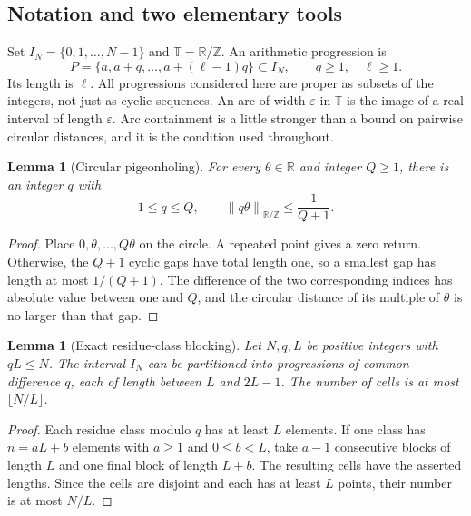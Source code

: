 \documentclass[11pt,letterpaper]{article}
\numberwithin{equation}{section}
\newtheorem{lemma}[theorem]{Lemma}
\theoremstyle{definition}
\theoremstyle{remark}
\newcommand{\R}{\mathbb R}
\newcommand{\Z}{\mathbb Z}
\newcommand{\T}{\mathbb T}
\newcommand{\1}{\mathbf 1}
\newcommand{\cnorm}[1]{\left\|#1\right\|_{\R/\Z}}
\newcommand{\eps}{\varepsilon}
\begin{document}
\subsection{Notation and two elementary tools}
Set $I_N=\{0,1,\ldots,N-1\}$ and $\T=\R/\Z$. An arithmetic progression is
\[
 P=\{a,a+q,\ldots,a+(\ell-1)q\}\subset I_N,
 \qquad q\geq1,\quad \ell\geq1.
\]
Its length is $\ell$. All progressions considered here are proper as subsets of the integers, not just as cyclic sequences. An arc of width $\eps$ in $\T$ is the image of a real interval of length $\eps$. Arc containment is a little stronger than a bound on pairwise circular distances, and it is the condition used throughout.

\begin{lemma}[Circular pigeonholing]
\label{gsr:dt:05:lem:circle}
For every $\theta\in\R$ and integer $Q\geq1$, there is an integer $q$ with
\[
 1\leq q\leq Q,\qquad \cnorm{q\theta}\leq\frac1{Q+1}.
\]
\end{lemma}
\begin{proof}
Place $0,\theta,\ldots,Q\theta$ on the circle. A repeated point gives a zero return. Otherwise, the $Q+1$ cyclic gaps have total length one, so a smallest gap has length at most $1/(Q+1)$. The difference of the two corresponding indices has absolute value between one and $Q$, and the circular distance of its multiple of $\theta$ is no larger than that gap.
\end{proof}

\begin{lemma}[Exact residue-class blocking]
\label{gsr:dt:05:lem:chunks}
Let $N,q,L$ be positive integers with $qL\leq N$. The interval $I_N$ can be partitioned into progressions of common difference $q$, each of length between $L$ and $2L-1$. The number of cells is at most $\lfloor N/L\rfloor$.
\end{lemma}
\begin{proof}
Each residue class modulo $q$ has at least $L$ elements. If one class has $n=aL+b$ elements with $a\geq1$ and $0\leq b<L$, take $a-1$ consecutive blocks of length $L$ and one final block of length $L+b$. The resulting cells have the asserted lengths. Since the cells are disjoint and each has at least $L$ points, their number is at most $N/L$.
\end{proof}
\end{document}
